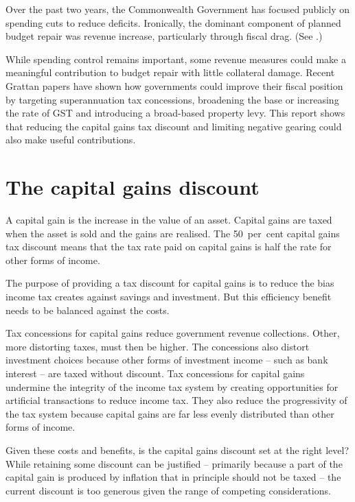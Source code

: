 Over the past two years, the Commonwealth Government has focused publicly on spending cuts to reduce deficits. Ironically, the dominant component of planned budget repair was revenue increase, particularly through fiscal drag. (See .) %
 
While spending control remains important, some revenue measures could make a meaningful contribution to budget repair with little collateral damage. Recent Grattan papers have shown how governments could improve their fiscal position by targeting superannuation tax concessions, broadening the base or increasing the rate of GST and introducing a broad-based property levy. This report shows that reducing the capital gains tax discount and limiting negative gearing could also make useful contributions.


\chapter{The capital gains discount}\label{chapter:The-capital-gains-discount}
A capital gain is the increase in the value of an asset. Capital gains are taxed when the asset is sold and the gains are realised. The 50~per~cent capital gains tax discount means that the tax rate paid on capital gains is half the rate for other forms of income. 

The purpose of providing a tax discount for capital gains is to reduce the bias income tax creates against savings and investment. But this efficiency benefit needs to be balanced against the costs. 

Tax concessions for capital gains reduce government revenue collections. Other, more distorting taxes, must then be higher. The concessions also distort investment choices because other forms of investment income – such as bank interest – are taxed without discount. Tax concessions for capital gains undermine the integrity of the income tax system by creating opportunities for artificial transactions to reduce income tax. They also reduce the progressivity of the tax system because capital gains are far less evenly distributed than other forms of income. 

Given these costs and benefits, is the capital gains discount set at the right level? While retaining some discount can be justified – primarily because a part of the capital gain is produced by inflation that in principle should not be taxed – the current discount is too generous given the range of competing considerations.


